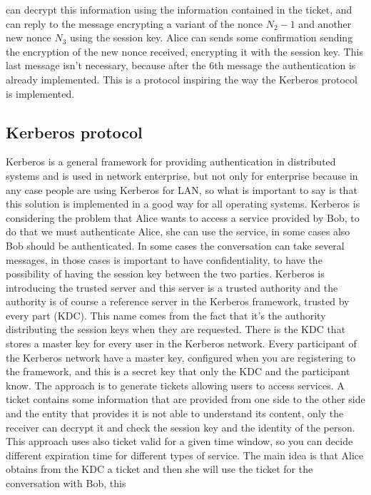 \documentclass[11pt]{article}
\begin{document}
can decrypt this information using the information contained in the ticket, and can reply to the message encrypting a variant of the nonce $N_2 - 1$ and another new nonce $N_3$ using the session key. Alice can sends some confirmation sending the encryption of the
new nonce received, encrypting it with the session key. This last message isn't necessary, because after the 6th message the authentication is already implemented. This is a protocol inspiring the way the Kerberos protocol is implemented.
\subsection{Kerberos protocol}
Kerberos is a general framework for providing authentication in distributed systems and is used in network enterprise, but not only for enterprise because in any case people are using Kerberos for LAN, so what is important to say is that this solution is implemented in a good way for all operating systems. Kerberos is considering the problem that Alice wants to access a service provided by Bob, to do that we must authenticate Alice, she can use the service, in some cases also Bob should be authenticated. In some cases the conversation can take several messages, in those cases is important to have confidentiality, to have the possibility of having the session key between the two parties. Kerberos is introducing the trusted server and this server is a trusted authority and the authority is of course a reference server in the Kerberos framework, trusted by every part (KDC). This name comes from the fact that it's
the authority distributing the session keys when they are requested. There is the KDC that stores a master key for every user in the Kerberos network. Every participant of the Kerberos network have a master key, configured when you are registering to the framework, and this is a secret key that only the KDC and the participant know. The approach is to generate tickets allowing users to access services. A ticket contains some information that are provided from one side to the other side and the entity that provides it is not able to understand its content, only the receiver can decrypt it and check the session key and the identity of the person. This approach uses also ticket valid for a given time window, so you can decide different expiration time for different types of service. The main idea is that Alice obtains from the KDC a ticket and then she will use the ticket for the conversation with Bob, this
\end{document}

